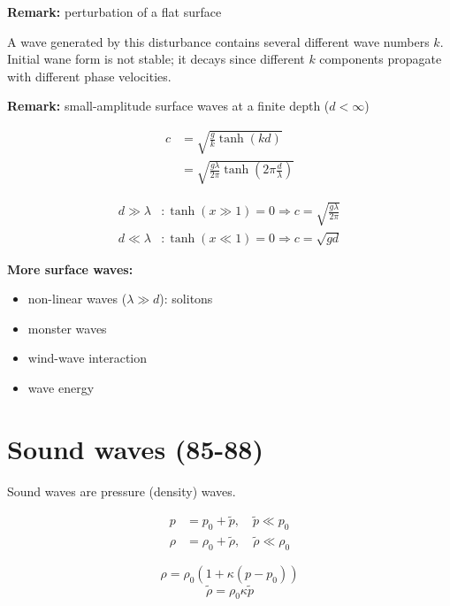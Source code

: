 \begin{framed}
\textbf{Remark:} perturbation of a flat surface

A wave generated by this disturbance contains several different wave numbers $k$. Initial wane form is not stable; it decays since different $k$ components propagate with different phase velocities.
\end{framed}

\begin{framed}
\textbf{Remark:} small-amplitude surface waves at a finite depth ($d<\infty$)

\begin{align}
c &= \sqrt{\frac{g}{k}\tanh(kd)}\\
&= \sqrt{\frac{g\lambda}{2\pi}\tanh\left(2\pi\frac{d}{\lambda}\right)}
\end{align}

\begin{align}
d\gg\lambda&: \tanh(x\gg1)=0  \Rightarrow c=\sqrt{\frac{g\lambda}{2\pi}}\\
d\ll\lambda&: \tanh(x\ll1)=0 \Rightarrow c=\sqrt{gd}
\end{align}
\end{framed}

\textbf{More surface waves:}

\begin{itemize}
\item non-linear waves ($\lambda\gg d$): solitons
\item monster waves
\item wind-wave interaction
\item wave energy
\end{itemize}



\section{Sound waves (85-88)}
Sound waves are pressure (density) waves.

\begin{align}
p&=p_0+\tilde{p}, \quad\tilde{p}\ll p_0\\
\rho&=\rho_0+\tilde{\rho}, \quad\tilde{\rho}\ll\rho_0
\end{align}

\begin{equation}
\rho=\rho_0(1+\kappa(p-p_0))
\end{equation}
\begin{equation}
\tilde{\rho} = \rho_0\kappa\tilde{p}
\end{equation}

